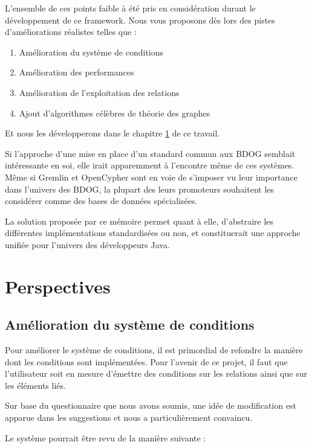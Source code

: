 \documentclass[a4paper,fleqn,12pt]{report}
\begin{document}
L'ensemble de ces points faible à été pris en considération durant le développement de ce framework. Nous vous proposons dès lors des pistes d'améliorations réalistes telles que : 
\begin{enumerate}
\item Amélioration du système de conditions
\item Amélioration des performances
\item Amélioration de l'exploitation des relations
\item Ajout d'algorithmes célèbres de théorie des graphes
\end{enumerate}
 
Et nous les développerons dans le chapitre \ref{perspectives} de ce travail.

\vspace{1cm}

Si l'approche d'une mise en place d'un standard commun aux BDOG semblait intéressante en soi, elle irait apparemment à l'encontre même de ces systèmes. Même si Gremlin et OpenCypher sont en voie de s'imposer vu leur importance dans l'univers des BDOG, la plupart des leurs promoteurs souhaitent les considérer comme des bases de données spécialisées.

La solution proposée par ce mémoire permet quant à elle, d'abstraire les différentes implémentations standardisées ou non, et constituerait une approche unifiée pour l'univers des développeurs Java.

\chapter{Perspectives}
\label{perspectives}
\section{Amélioration du système de conditions}

Pour améliorer le système de conditions, il est primordial de refondre la manière dont les conditions sont implémentées. Pour l'avenir de ce projet, il faut que l'utilisateur soit en mesure d'émettre des conditions sur les relations ainsi que sur les éléments liés.

Sur base du questionnaire que nous avons soumis, une idée de modification est apparue dans les suggestions et nous a particulièrement convaincu. 

Le système pourrait être revu de la manière suivante : 
\end{document}
